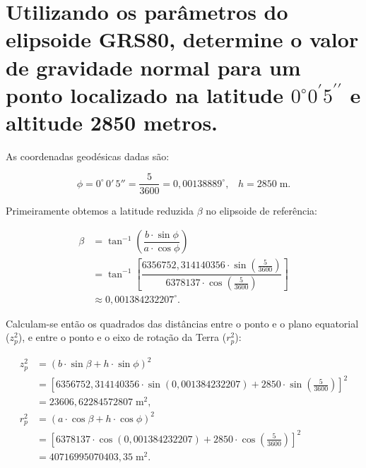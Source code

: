 
\section{Utilizando os parâmetros do elipsoide GRS80, determine o valor de gravidade normal para um ponto localizado na latitude \(0^\circ 0^\prime 5^{\prime\prime}\) e altitude 2850 metros.}



\noindent
As coordenadas geodésicas dadas são:

\[
\phi = 0^\circ\,0'\,5'' = \dfrac{5}{3600} = 0{,}00138889^\circ \text{,} \quad h = 2850 \; \text{m} \text{.}
\]

\noindent
Primeiramente obtemos a latitude reduzida \(\beta\) no elipsoide de referência:

\[
\begin{aligned}
   \beta &= \tan^{-1}\left( \dfrac{b \cdot \sin \phi}{a \cdot \cos \phi} \right) \\
         &= \tan^{-1}\left[ \dfrac{6356752{,}314140356 \cdot \sin(\frac{5}{3600})}{6378137 \cdot \cos(\frac{5}{3600})} \right] \\
         &\approx 0{,}001384232207^\circ \text{.}
\end{aligned}
\]

\noindent
Calculam-se então os quadrados das distâncias entre o ponto e o plano equatorial (\(z_p^2\)), e entre o ponto e o eixo de rotação da Terra (\(r_p^2\)):

\[
\begin{aligned}
   z_p^2 &= \left( b \cdot \sin\beta + h \cdot \sin\phi \right)^2 \\
         &= \left[ 6356752{,}314140356 \cdot \sin(0{,}001384232207) + 2850 \cdot \sin\left(\frac{5}{3600}\right) \right]^2 \\
         &= 23606{,}62284572807 \; \text{m}^2 \text{,} \\
   r_p^2 &= \left( a \cdot \cos\beta + h \cdot \cos\phi \right)^2 \\
         &= \left[6378137 \cdot \cos(0{,}001384232207) + 2850 \cdot \cos\left(\frac{5}{3600}\right)\right]^2 \\
         &= 40716995070403{,}35 \; \text{m}^2 \text{.}
\end{aligned}
\]

